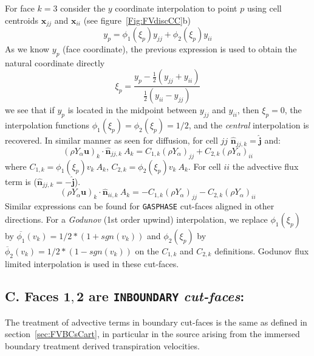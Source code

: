For face $k=3$ consider the $y$ coordinate interpolation to point $p$ using cell centroids $\mathbf{x}_{jj}$ and $\mathbf{x}_{ii}$ (see  figure~\ref{Fig:FVdiscCC}b)
%
\begin{equation}
  y_p =  \phi_1(\xi_p) y_{jj} + \phi_2(\xi_p) y_{ii}
\end{equation}
%
As we know $y_p$ (face coordinate), the previous expression is used to obtain the natural coordinate directly
%
\begin{equation}
  \xi_p = \frac{y_p - \frac{1}{2} \left( y_{jj} + y_{ii} \right)}{\frac{1}{2} \left( y_{ii} - y_{jj} \right)}
\end{equation}
%
we see that if $y_p$ is located in the midpoint between $y_{jj}$ and $y_{ii}$, then $\xi_p=0$, the interpolation functions $\phi_1(\xi_p)=\phi_2(\xi_p)=1/2$, and the \textit{central} interpolation is recovered. In similar manner as seen for diffusion, for cell $jj$
$\hat{\mathbf{n}}_{jj,k}=\hat{\mathbf{j}}$ and:
%
\begin{equation}
   \left( \rho Y_\alpha \mathbf{u} \right)_k \cdot \hat{\mathbf{n}}_{jj,k} \: A_k = C_{1,k} \left( \rho Y_\alpha \right)_{jj} + C_{2,k} \left( \rho Y_\alpha \right)_{ii}
\end{equation}
%
where $C_{1,k}=\phi_1(\xi_p) v_k \: A_k$, $C_{2,k}=\phi_2(\xi_p) v_k \: A_k$. For cell $ii$ the advective flux term is
($\hat{\mathbf{n}}_{jj,k}=-\hat{\mathbf{j}}$).
%
\begin{equation}
   \left( \rho Y_\alpha \mathbf{u} \right)_k \cdot \hat{\mathbf{n}}_{ii,k} \: A_k = - C_{1,k}  \left( \rho Y_\alpha \right)_{jj} - C_{2,k}  \left( \rho Y_\alpha \right)_{ii}
\end{equation}
%
Similar expressions can be found for \texttt{GASPHASE} cut-faces aligned in other directions. For a \textit{Godunov} (1st order upwind) interpolation,
we replace $\phi_1(\xi_p)$ by $\overline{\phi_1}(v_k)=1/2*(1+sgn(v_k))$ and $\phi_2(\xi_p)$ by $\overline{\phi}_2(v_k)=1/2*(1-sgn(v_k))$ on the $C_{1,k}$ and $C_{2,k}$ definitions. Godunov flux limited interpolation is used in these cut-faces.


\subsection*{C. Faces $\mathbf{1},\mathbf{2}$ are \texttt{INBOUNDARY} \textit{cut-faces}:}

The treatment of advective terms in boundary cut-faces is the same as defined in section~\ref{sec:FVBCsCart}, in particular in the source arising from the immersed boundary treatment derived transpiration velocities.

